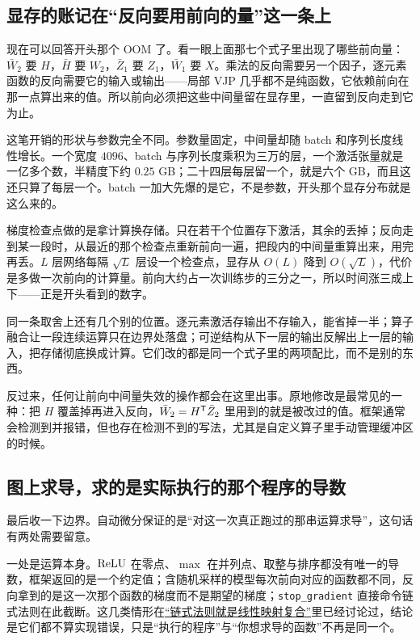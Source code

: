 \subsection{显存的账记在``反向要用前向的量''这一条上}

现在可以回答开头那个 OOM 了。看一眼上面那七个式子里出现了哪些前向量：\(\bar W_2\) 要 \(H\)，\(\bar H\) 要 \(W_2\)，\(\bar Z_1\) 要 \(Z_1\)，\(\bar W_1\) 要 \(X\)。乘法的反向需要另一个因子，逐元素函数的反向需要它的输入或输出——局部 VJP 几乎都不是纯函数，它依赖前向在那一点算出来的值。所以前向必须把这些中间量留在显存里，一直留到反向走到它为止。

这笔开销的形状与参数完全不同。参数量固定，中间量却随 batch 和序列长度线性增长。一个宽度 \(4096\)、batch 与序列长度乘积为三万的层，一个激活张量就是一亿多个数，半精度下约 \(0.25\) GB；二十四层每层留一个，就是六个 GB，而且这还只算了每层一个。batch 一加大先爆的是它，不是参数，开头那个显存分布就是这么来的。

梯度检查点做的是拿计算换存储。只在若干个位置存下激活，其余的丢掉；反向走到某一段时，从最近的那个检查点重新前向一遍，把段内的中间量重算出来，用完再丢。\(L\) 层网络每隔 \(\sqrt L\) 层设一个检查点，显存从 \(O(L)\) 降到 \(O(\sqrt L)\)，代价是多做一次前向的计算量。前向大约占一次训练步的三分之一，所以时间涨三成上下——正是开头看到的数字。

同一条取舍上还有几个别的位置。逐元素激活存输出不存输入，能省掉一半；算子融合让一段连续运算只在边界处落盘；可逆结构从下一层的输出反解出上一层的输入，把存储彻底换成计算。它们改的都是同一个式子里的两项配比，而不是别的东西。

反过来，任何让前向中间量失效的操作都会在这里出事。原地修改是最常见的一种：把 \(H\) 覆盖掉再进入反向，\(\bar W_2=H^{\mathsf{T}}\bar Z_2\) 里用到的就是被改过的值。框架通常会检测到并报错，但也存在检测不到的写法，尤其是自定义算子里手动管理缓冲区的时候。

\subsection{图上求导，求的是实际执行的那个程序的导数}

最后收一下边界。自动微分保证的是``对这一次真正跑过的那串运算求导''，这句话有两处需要留意。

一处是运算本身。\(\operatorname{ReLU}\) 在零点、\(\max\) 在并列点、取整与排序都没有唯一的导数，框架返回的是一个约定值；含随机采样的模型每次前向对应的函数都不同，反向拿到的是这一次那个函数的梯度而不是期望的梯度；\texttt{stop\_gradient} 直接命令链式法则在此截断。这几类情形在\hyperref[sec:10-Matrix-Calculus/02-Differentials/02]{``链式法则就是线性映射复合''}里已经讨论过，结论是它们都不算实现错误，只是``执行的程序''与``你想求导的函数''不再是同一个。

